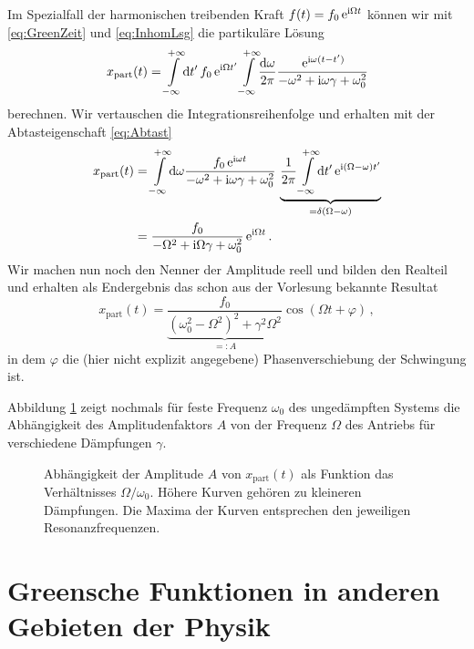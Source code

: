 \documentclass[paper=a4, fontsize=11.0pt, abstractoff, DIV12]{scrartcl}
\newcommand{\xinhom}{\ensuremath{x_\mathrm{part}}}
\begin{document}
Im Spezialfall der harmonischen treibenden Kraft $f(t) = f_0\,{\mathrm{e}}^{\mathrm{i}\Omega t}$
können wir mit \eqref{eq:GreenZeit} und \eqref{eq:InhomLsg} die partikuläre
Lösung
\begin{equation}
\xinhom(t) = \int\limits_{-\infty}^{+\infty}\!\dd t'\,f_0\eto{\ii\Omega t'} \int\limits_{-\infty}^{+\infty}\!\frac{\dd\omega}{2\pi}\frac{\eto{\ii\omega(t- t')}}{-\omega^2 + \ii\omega\gamma + \omega_0^2}
\end{equation}
berechnen. Wir vertauschen die Integrationsreihenfolge und erhalten mit der
Abtasteigenschaft \eqref{eq:Abtast}
\begin{align}
\xinhom(t) &= \int\limits_{-\infty}^{+\infty}\!{\dd\omega}\frac{f_0 \eto{\ii\omega t}}{-\omega^2 + \ii\omega\gamma + \omega_0^2}\,\underbrace{\frac{1}{2\pi}\int\limits_{-\infty}^{+\infty}\!\dd t' \eto{\ii (\Omega-\omega)t'}}_{=\delta(\Omega-\omega)}\\
&=\frac{f_0}{-\Omega^2 + \ii\Omega\gamma + \omega_0^2}\eto{\ii\Omega t}\,.
\end{align}
Wir machen nun noch den Nenner der Amplitude reell und bilden den Realteil und
erhalten als Endergebnis das schon aus der Vorlesung bekannte Resultat
\begin{equation}
\xinhom(t) = \underbrace{\frac{f_0}{(\omega_0^2 - \Omega^2)^2 + \gamma^2\Omega^2}}_{=: A}\cos(\Omega t + \varphi)\,,
\end{equation}
in dem $\varphi$ die (hier nicht explizit angegebene) Phasenverschiebung der Schwingung
ist.

Abbildung \ref{fig:Ampls} zeigt nochmals für feste Frequenz $\omega_0$ des
ungedämpften Systems die Abhängigkeit des Amplitudenfaktors $A$ von der
Frequenz $\Omega$ des Antriebs für verschiedene Dämpfungen $\gamma$.
\begin{figure}[!htb]
    \centering
    
    \caption{Abhängigkeit der Amplitude $A$ von $\xinhom(t)$ als Funktion das
    Verhältnisses $\Omega/\omega_0$. Höhere Kurven gehören zu kleineren
    Dämpfungen. Die Maxima der Kurven entsprechen den jeweiligen
    Resonanzfrequenzen.}
    \label{fig:Ampls}
\end{figure}


\section{Greensche Funktionen in anderen Gebieten der Physik}
\end{document}
